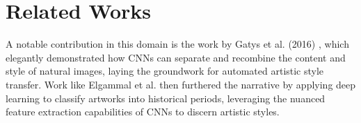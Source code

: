 \documentclass[twocolumn]{article}
\begin{document}


\section{Related Works}

A notable contribution in this domain is the work by Gatys et al. (2016) \cite{gatysNeuralAlgorithmArtistic2015}, which elegantly demonstrated how CNNs can separate and recombine the content and style of natural images, laying the groundwork for automated artistic style transfer. Work like Elgammal et al. \cite{Elgammal} then furthered the narrative by applying deep learning to classify artworks into historical periods, leveraging the nuanced feature extraction capabilities of CNNs to discern artistic styles. 


\end{document}
